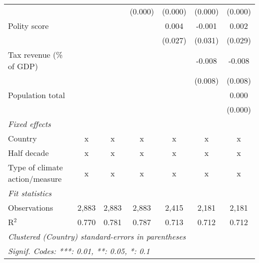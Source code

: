 \begin{tabular}{lcccccc}
                                                                                        &         &                & (0.000)        & (0.000)        & (0.000)        & (0.000)\\   
   Polity score                                                                         &         &                &                & 0.004          & -0.001         & 0.002\\   
                                                                                        &         &                &                & (0.027)        & (0.031)        & (0.029)\\   
   Tax revenue (\% of GDP)                                                              &         &                &                &                & -0.008         & -0.008\\   
                                                                                        &         &                &                &                & (0.008)        & (0.008)\\   
   Population total                                                                     &         &                &                &                &                & 0.000\\   
                                                                                        &         &                &                &                &                & (0.000)\\   
   \emph{Fixed effects}\\
   Country                                                                              & x       & x              & x              & x              & x              & x\\  
   Half decade                                                                          & x       & x              & x              & x              & x              & x\\  
   Type of climate action/measure                                                       & x       & x              & x              & x              & x              & x\\  
   \midrule \emph{Fit statistics}\\
   Observations                                                                         & 2,883   & 2,883          & 2,883          & 2,415          & 2,181          & 2,181\\  
   R$^2$                                                                                & 0.770   & 0.781          & 0.787          & 0.713          & 0.712          & 0.712\\  
   \midrule
   \multicolumn{7}{l}{\emph{Clustered (Country) standard-errors in parentheses}}\\
   \multicolumn{7}{l}{\emph{Signif. Codes: ***: 0.01, **: 0.05, *: 0.1}}\\
\end{tabular}
\par\endgroup


